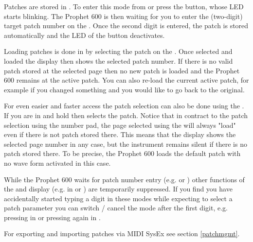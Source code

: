 Patches are stored in \storagemode. To enter this mode from \presetmode or \livemode press the \record button, whose LED starts blinking. The Prophet 600 is then waiting for you to enter the (two-digit) target patch number on the \termnumberpad. Once the second digit is entered, the patch is stored automatically and the LED of the \record button deactivates. 

Loading patches is done in \presetpatch by selecting the patch on the \termnumberpad. Once selected and loaded the display then shows the selected patch number. If there is no valid patch stored at the selected page then no new patch is loaded and the Prophet 600 remains at the active patch. You can also re-load the current active patch, for example if you changed something and you would like to go back to the original. 

For even easier and faster access the patch selection can also be done using the \datadial. If you are in \presetmode and hold \fromtape then \datadial selects the patch. Notice that in contract to the patch selection using the number pad, the page selected using the \datadial will always "load" even if there is not patch stored there. This means that the display shows the selected page number in any case, but the instrument remains silent if there is no patch stored there. To be precise, the Prophet 600 loads the default patch with no wave form activated in this case. 

While the Prophet 600 waits for patch number entry (e.g. \storagemode or \presetpatch) other functions of the \termnumberpad and display (e.g. in \presetpanel or \livemode) are temporarily suppressed. If you find you have accidentally started typing a digit in these modes while expecting to select a patch parameter you can switch / cancel the mode after the first digit, e.g. pressing \totape in \presetpatch or pressing \record again in \storagemode.

For exporting and importing patches via MIDI SysEx see section \ref{patchmgmt}.
